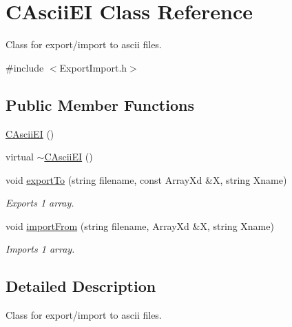 \hypertarget{class_c_ascii_e_i}{\section{C\-Ascii\-E\-I Class Reference}
\label{class_c_ascii_e_i}
}


Class for export/import to ascii files.  




{\ttfamily \#include $<$Export\-Import.\-h$>$}

\subsection*{Public Member Functions}
\begin{DoxyCompactItemize}
\item 
\hyperlink{class_c_ascii_e_i_aba183a4a9c1b1147646c4297159d798c}{C\-Ascii\-E\-I} ()
\item 
virtual \hyperlink{class_c_ascii_e_i_a2a45c9e35a2d1e965bab209de2975eda}{$\sim$\-C\-Ascii\-E\-I} ()
\item 
void \hyperlink{class_c_ascii_e_i_a1b039bbb6eddf444802c0485bd276959}{export\-To} (string filename, const Array\-Xd \&X, string Xname)
\begin{DoxyCompactList}\small\item\em Exports 1 array. \end{DoxyCompactList}\item 
void \hyperlink{class_c_ascii_e_i_a7cc3ad8a4df65e2b71538aec864b8516}{import\-From} (string filename, Array\-Xd \&X, string Xname)
\begin{DoxyCompactList}\small\item\em Imports 1 array. \end{DoxyCompactList}\end{DoxyCompactItemize}


\subsection{Detailed Description}
Class for export/import to ascii files. 

